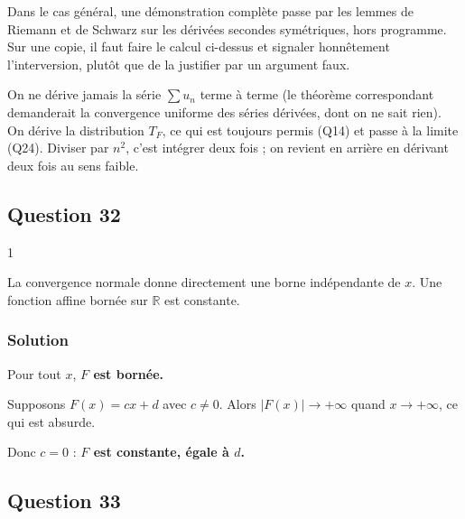 \documentclass[11pt,a4paper]{article}
\newcommand{\equationajustee}[1]{%
  \sbox{\boiteequation}{$\displaystyle #1$}%
  \ifdim\wd\boiteequation>\linewidth
    \[\resizebox{\linewidth}{!}{\usebox{\boiteequation}}\]%
  \else
    \[#1\]%
  \fi}
\begin{document}
Dans le cas général, une démonstration complète passe par les lemmes de Riemann et de Schwarz sur les dérivées secondes symétriques, hors programme. Sur une copie, il faut faire le calcul ci-dessus et signaler honnêtement l'interversion, plutôt que de la justifier par un argument faux.

\begin{methode}

On ne dérive jamais la série \(\sum u_n\) terme à terme (le théorème correspondant demanderait la convergence uniforme des séries dérivées, dont on ne sait rien). On dérive la distribution \(T_F\), ce qui est toujours permis (Q14) et passe à la limite (Q24). Diviser par \(n^2\), c'est intégrer deux fois ; on revient en arrière en dérivant deux fois au sens faible.

\end{methode}

\hypertarget{question-32}{%
\subsection{Question 32}\label{question-32}}

\begin{indication}{1}

La convergence normale donne directement une borne indépendante de \(x\). Une fonction affine bornée sur \(\mathbb R\) est constante.

\end{indication}

\hypertarget{solution-31}{%
\subsubsection{Solution}\label{solution-31}}

Pour tout \(x\),
\equationajustee{\begin{aligned}
|F(x)|&\leqslant\sum_{n\geqslant1}\|f_n\|_\infty\\
&\leqslant M\sum_{n\geqslant1}\frac1{n^2}\\
&=\frac{M\pi^2}6.
\end{aligned}}
\textbf{\(F\) est bornée.}

Supposons \(F(x)=cx+d\) avec \(c\neq0\). Alors \(|F(x)|\to+\infty\) quand \(x\to+\infty\), ce qui est absurde.

Donc \(c=0\) : \textbf{\(F\) est constante, égale à \(d\).}

\hypertarget{question-33}{%
\subsection{Question 33}\label{question-33}}
\end{document}
